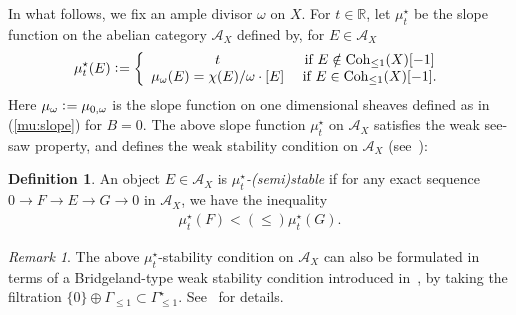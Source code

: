 \documentclass[11pt]{amsart}
\theoremstyle{plain}
\theoremstyle{definition}
\newtheorem{defi}[thm]{Definition}
\theoremstyle{remark}
\newtheorem{rmk}[thm]{Remark}
\newcommand{\aA}{\mathcal{A}}
\newcommand{\Coh}{\mathop{\rm Coh}\nolimits}
\begin{document}
In what follows, we fix an ample divisor 
$\omega$ on $X$.
For $t \in \mathbb{R}$, let $\mu_t^{\star}$ be the 
slope function on the abelian category $\aA_X$
defined by, for $E \in \aA_X$
\begin{align*}
\mu_t^{\star}(E) \cneq \left\{ \begin{array}{cc}
t & \mbox{ if } E \notin \Coh_{\le 1}(X)[-1] \\
\mu_{\omega}(E)=\chi(E)/\omega \cdot [E]
 & \mbox{ if } E \in \Coh_{\le 1}(X)[-1]. 
\end{array}  \right. 
\end{align*}
Here $\mu_{\omega} \cneq 
\mu_{0, \omega}$ is 
the slope function on 
one dimensional sheaves
defined as in (\ref{mu:slope})
for $B=0$. 
The above slope function $\mu_t^{\star}$
on $\aA_X$ satisfies the weak see-saw
property, and defines the 
weak stability condition on $\aA_X$
(see~\cite{Tolim2, Tsurvey}):
\begin{defi}
An object $E \in \aA_X$ is \textit{$\mu_t^{\star}$-(semi)stable}
if for any exact sequence $0 \to F \to E \to G \to 0$
in $\aA_X$, we have the inequality
\begin{align*}
\mu_t^{\star}(F)<(\le) \mu_t^{\star}(G).
\end{align*}
\end{defi}

\begin{rmk}
The above $\mu_t^{\star}$-stability condition on $\aA_X$
can 
also be 
formulated in terms of  a
Bridgeland-type weak stability condition
introduced in~\cite{Tcurve1}, 
by taking the filtration 
$\{0\} \oplus \Gamma_{\le 1} \subset \Gamma_{\le 1}^{\star}$.
See~\cite{Tsurvey} for details.
\end{rmk}
\end{document}
